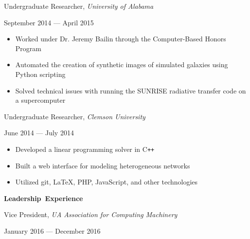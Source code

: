 \documentclass[11pt]{article}
\begin{document}
\vspace{0.4em}
\begin{minipage}[t]{0.65\textwidth}
\flushleft
Undergraduate Researcher, \textit{University of Alabama}\\
\end{minipage}
\begin{minipage}[t]{0.30\textwidth}
\flushright
September 2014 --- April 2015\\
\end{minipage}

\begin{itemize}
  \item Worked under Dr. Jeremy Bailin through the Computer-Based Honors Program
  \item Automated the creation of synthetic images of simulated galaxies using Python scripting
  \item Solved technical issues with running the SUNRISE radiative transfer code on a supercomputer
\end{itemize}

\begin{minipage}[t]{0.65\textwidth}
\flushleft
Undergraduate Researcher, \textit{Clemson University}\\
\end{minipage}
\begin{minipage}[t]{0.30\textwidth}
\flushright
June 2014 --- July 2014\\
\end{minipage}

\begin{itemize}
  \item Developed a linear programming solver in C\texttt{++}
  \item Built a web interface for modeling heterogeneous networks
  \item Utilized git, \LaTeX, PHP, JavaScript, and other technologies
\end{itemize}

\vspace{0.6em}
\hbox{\large \textbf{Leadership Experience}}

\vspace{0.4em}
\begin{minipage}[t]{0.65\textwidth}
\flushleft
Vice President, \textit{UA Association for Computing Machinery}\\
\end{minipage}
\begin{minipage}[t]{0.30\textwidth}
\flushright
January 2016 --- December 2016\\
\end{minipage}
\end{document}
